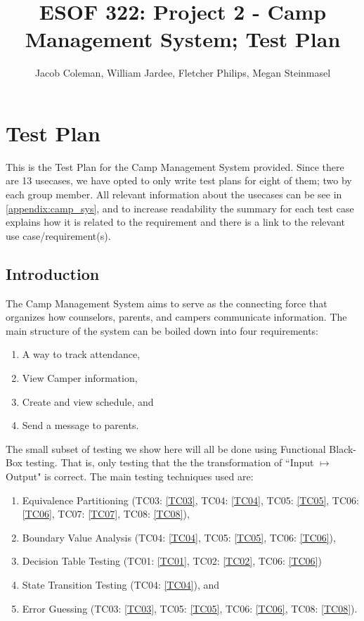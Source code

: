 \documentclass[11pt]{article}
\begin{document}
\title{ESOF 322: Project 2 - Camp Management System; Test Plan}
\author{Jacob Coleman, William Jardee, Fletcher Philips, Megan Steinmasel}
\maketitle




\section*{Test Plan}

This is the Test Plan for the Camp Management System provided. Since there are 13 usecases, we have opted to only write test plans for eight of them; two by each group member. All relevant information about the usecases can be see in \cref{appendix:camp_sys}, and to increase readability the summary for each test case explains how it is related to the requirement and there is a link to the relevant use case/requirement(s).

\subsection*{Introduction}
The Camp Management System aims to serve as the connecting force that organizes how counselors, parents, and campers communicate information. The main structure of the system can be boiled down into four requirements:
\begin{enumerate}
	\item A way to track attendance,
	\item View Camper information,
	\item Create and view schedule, and
	\item Send a message to parents.
\end{enumerate}
The small subset of testing we show here will all be done using Functional Black-Box testing. That is, only testing that the the transformation of ``Input $\mapsto$ Output" is correct. The main testing techniques used are:
\begin{enumerate}
	\item Equivalence Partitioning (TC03: \cref{TC03}, TC04: \cref{TC04}, TC05: \cref{TC05}, TC06: \cref{TC06}, TC07: \cref{TC07}, TC08: \cref{TC08}),
	\item Boundary Value Analysis (TC04: \cref{TC04}, TC05: \cref{TC05}, TC06: \cref{TC06}),
	\item Decision Table Testing (TC01: \cref{TC01}, TC02: \cref{TC02}, TC06: \cref{TC06})
	\item State Transition Testing (TC04: \cref{TC04}), and
	\item Error Guessing  (TC03: \cref{TC03}, TC05: \cref{TC05}, TC06: \cref{TC06}, TC08: \cref{TC08}).
\end{enumerate}
\end{document}
